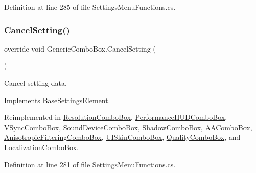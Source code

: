 Definition at line 285 of file Settings\+Menu\+Functions.\+cs.

\mbox{\label{class_generic_combo_box_a0949a84cf1e33d13346cb90597e005ce}} 
\subsubsection{\texorpdfstring{Cancel\+Setting()}{CancelSetting()}}
{\footnotesize\ttfamily override void Generic\+Combo\+Box.\+Cancel\+Setting (\begin{DoxyParamCaption}{ }\end{DoxyParamCaption})\hspace{0.3cm}{\ttfamily [virtual]}}



Cancel setting data. 



Implements \hyperlink{class_base_settings_element_a66f796e4aaa1e660a7db3e69547412d3}{Base\+Settings\+Element}.



Reimplemented in \hyperlink{class_resolution_combo_box_a0c831260eeb5fe60b9cb655693af4fa2}{Resolution\+Combo\+Box}, \hyperlink{class_performance_h_u_d_combo_box_a29adb8a1a56ad279f6a87e4efc1ea5e0}{Performance\+H\+U\+D\+Combo\+Box}, \hyperlink{class_v_sync_combo_box_a76f577ef0c4f59871313a824ef98058e}{V\+Sync\+Combo\+Box}, \hyperlink{class_sound_device_combo_box_af557c68898898b0a6b490b72f56ff082}{Sound\+Device\+Combo\+Box}, \hyperlink{class_shadow_combo_box_a8ab8daef08695bae23b99fd41ce1f6c1}{Shadow\+Combo\+Box}, \hyperlink{class_a_a_combo_box_a1886a8ebd7ed57a6a5739469c6a88f65}{A\+A\+Combo\+Box}, \hyperlink{class_anisotropic_filtering_combo_box_ae2c2cdc46f898319f43eff20acd32b6f}{Anisotropic\+Filtering\+Combo\+Box}, \hyperlink{class_u_i_skin_combo_box_adf108006beddfd416f81ec09ecd025f9}{U\+I\+Skin\+Combo\+Box}, \hyperlink{class_quality_combo_box_a04e70d34dd0b977690f593cfd4ecbe6b}{Quality\+Combo\+Box}, and \hyperlink{class_localization_combo_box_a67bf48bcaf083f7cdfb59fe2e82d0f12}{Localization\+Combo\+Box}.



Definition at line 281 of file Settings\+Menu\+Functions.\+cs.

\mbox{\label{class_generic_combo_box_a2dd11da6d2387f7adb28303113ec4c2d}} 
